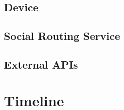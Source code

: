 \documentclass{article}
\begin{document}
        \subsection{Device}  
          
        \subsection{Social Routing Service}
           
        \subsection{External APIs}
            
    \section{Timeline}   
\end{document}
